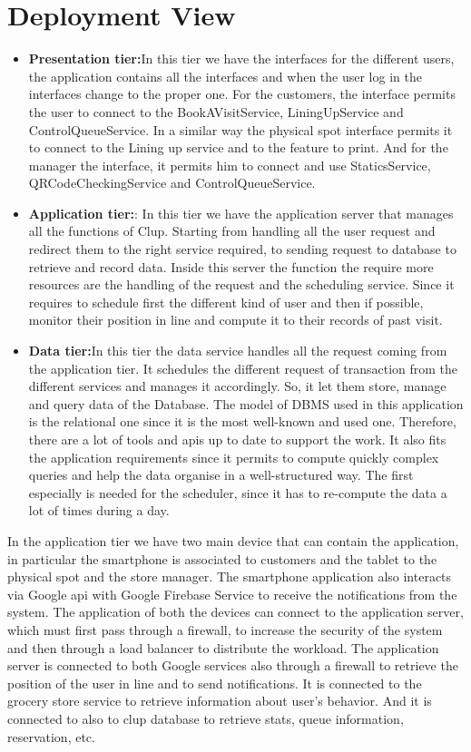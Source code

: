 \section{Deployment View}
\begin{itemize}
	\item \textbf{Presentation tier:}In this tier we have the interfaces for the different users, the application contains all the interfaces and when the user log in the interfaces change to the proper one. For the customers, the interface permits the user to connect to the BookAVisitService, LiningUpService and ControlQueueService. In a similar way the physical spot interface permits it to connect to the Lining up service and to the feature to print. And for the manager the interface, it permits him to connect and use StaticsService, QRCodeCheckingService and ControlQueueService.

	\item \textbf{Application tier:}: In this tier we have the application server that manages all the functions of Clup. Starting from handling all the user request and redirect them to the right service required, to sending request to database to retrieve and record data. Inside this server the function the require more resources are the handling of the request and the scheduling service. Since it requires to schedule first the different kind of user and then if possible, monitor their position in line and compute it to their records of past visit.

	\item \textbf{Data tier:}In this tier the data service handles all the request coming from the application tier. It schedules the different request of transaction from the different services and manages it accordingly. So, it let them store, manage and query data of the Database. The model of DBMS used in this application is the relational one since it is the most well-known and used one. Therefore, there are a lot of tools and \glspl{api} up to date to support the work. It also fits the application requirements since it permits to compute quickly complex queries and help the data organise in a well-structured way. The first especially is needed for the scheduler, since it has to re-compute the data a lot of times during a day. 
\end{itemize}
In the application tier we have two main device that can contain the application, in particular the smartphone is associated to customers and the tablet to the physical spot and the store manager. The smartphone application also interacts via Google \gls{api} with Google Firebase Service to receive the notifications from the system. The application of both the devices can connect to the application server, which must first pass through a firewall, to increase the security of the system and then through a load balancer to distribute the workload. 
The application server is connected to both Google services also through a firewall to retrieve the position of the user in line and to send notifications. It is connected to the grocery store service to retrieve information about user’s behavior. And it is connected to also to \gls{clup} database to retrieve stats, queue information, reservation, etc. 

